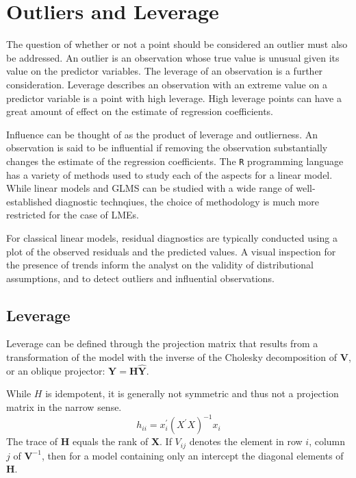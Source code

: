 \documentclass[Main.tex]{subfiles}
\begin{document}
	\section{Outliers and Leverage}
	
	
	
	The question of whether or not a point should be considered an outlier must also be addressed. An outlier is an observation whose true value is unusual given its value on the predictor variables. The leverage of an observation is a further consideration. Leverage describes an observation with an extreme value on a predictor variable is a point with high leverage. High leverage points can have a great amount of effect on the estimate of regression coefficients.
	
	Influence can be thought of as the product of leverage and outlierness. An observation is said to be influential if removing the observation substantially changes the estimate of the regression coefficients. The \texttt{R} programming language has a variety of methods used to study each of the aspects for a linear model. While linear models and GLMS can be studied with a wide range of well-established diagnostic technqiues, the choice of methodology is much more restricted for the case of LMEs.
	
	For classical linear models, residual diagnostics are typically conducted using a plot of the observed residuals and the predicted values. A visual inspection for the presence of trends inform the analyst on the validity of distributional assumptions, and to detect outliers and influential observations.
\subsection{Leverage}
Leverage can be defined through the projection matrix that results from a transformation of the model with the inverse of the Cholesky decomposition of $\boldsymbol{V}$, or an oblique projector:	$\boldsymbol{Y} = \boldsymbol{H}\boldsymbol{\hat{Y}}$.

While $H$ is idempotent, it is generally not symmetric and thus not a projection matrix in the narrow sense.
\[ h_{ii} = x^{\prime}_{i}(X^{\prime}X)^{-1}x_{i} \]
The trace of $\boldsymbol{H}$ equals the rank of $\boldsymbol{X}$.
If $V_{ij}$ denotes the element in row $i$, column $j$ of $\boldsymbol{V}^{-1}$, then for a model containing only an intercept the diagonal elements of $\boldsymbol{H}$.
\end{document}
